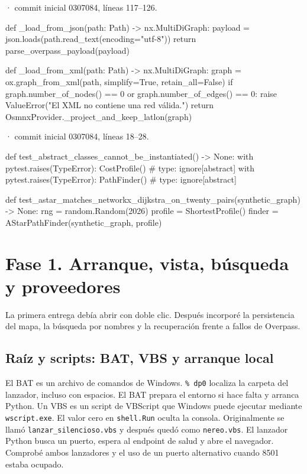 \documentclass[11pt,a4paper]{article}
\begin{document}
\smallskip
{\footnotesize\texttt{} · commit inicial 0307084, líneas 117--126.}\par
\begin{Codigo}[firstnumber=117]
def _load_from_json(path: Path) -> nx.MultiDiGraph:
    payload = json.loads(path.read_text(encoding="utf-8"))
    return parse_overpass_payload(payload)


def _load_from_xml(path: Path) -> nx.MultiDiGraph:
    graph = ox.graph_from_xml(path, simplify=True, retain_all=False)
    if graph.number_of_nodes() == 0 or graph.number_of_edges() == 0:
        raise ValueError("El XML no contiene una red válida.")
    return OsmnxProvider._project_and_keep_latlon(graph)
\end{Codigo}

\smallskip
{\footnotesize\texttt{} · commit inicial 0307084, líneas 18--28.}\par
\begin{Codigo}[firstnumber=18]
def test_abstract_classes_cannot_be_instantiated() -> None:
    with pytest.raises(TypeError):
        CostProfile()  # type: ignore[abstract]
    with pytest.raises(TypeError):
        PathFinder()  # type: ignore[abstract]


def test_astar_matches_networkx_dijkstra_on_twenty_pairs(synthetic_graph) -> None:
    rng = random.Random(2026)
    profile = ShortestProfile()
    finder = AStarPathFinder(synthetic_graph, profile)
\end{Codigo}

\section{Fase 1. Arranque, vista, búsqueda y proveedores}
La primera entrega debía abrir con doble clic. Después incorporé la persistencia del mapa, la búsqueda por nombres y la recuperación frente a fallos de Overpass.

\subsection{Raíz y scripts: BAT, VBS y arranque local}
El BAT es un archivo de comandos de Windows. \texttt{\%\string~dp0} localiza la carpeta del lanzador, incluso con espacios. El BAT prepara el entorno si hace falta y arranca Python. Un VBS es un script de VBScript que Windows puede ejecutar mediante \texttt{wscript.exe}. El valor cero en \texttt{shell.Run} oculta la consola. Originalmente se llamó \texttt{lanzar\_silencioso.vbs} y después quedó como \texttt{nereo.vbs}. El lanzador Python busca un puerto, espera al endpoint de salud y abre el navegador. Comprobé ambos lanzadores y el uso de un puerto alternativo cuando 8501 estaba ocupado.
\end{document}
